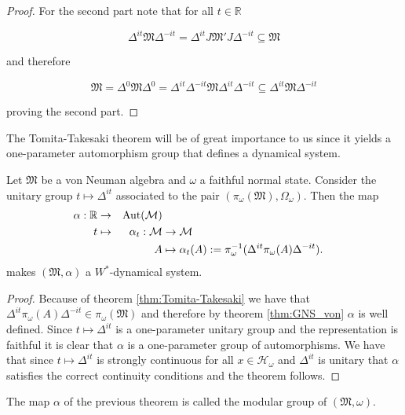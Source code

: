 \begin{proof}
For the second part note that for all $t\in\mathbb{R}$

\begin{equation}
\Delta^{it}\mathfrak{M}\Delta^{-it}=\Delta^{it}J\mathfrak{M}'J\Delta^{-it}\subseteq\mathfrak{M}
\end{equation}

and therefore

\begin{equation}
\mathfrak{M}=\Delta^0\mathfrak{M}\Delta^0=\Delta^{it}\Delta^{-it}\mathfrak{M}\Delta^{it}\Delta^{-it}\subseteq \Delta^{it}\mathfrak{M}\Delta^{-it}
\end{equation}

proving the second part.

\end{proof}

The Tomita-Takesaki theorem will be of great importance to us since it yields a one-parameter automorphism group that defines a dynamical system.

\begin{theorem}\label{thm:Dynamics_Tomita}
Let $\mathfrak{M}$ be a von Neuman algebra and $\omega$ a faithful normal state. Consider the unitary group $t\mapsto\Delta^{it}$ associated to the pair $(\pi_\omega(\mathfrak{M}),\Omega_\omega)$. Then the map
\begin{alignat}{2}
\alpha:\mathbb{R}&\rightarrow & \operatorname{Aut}(\mathcal{M}) \nonumber \\
t&\mapsto &\alpha_t:\mathcal{M} & \rightarrow\mathcal{M} \\
&&A&\mapsto \alpha_t(A):=\pi_\omega^{-1}(\Delta^{it}\pi_\omega(A)\Delta^{-it}). \nonumber
\end{alignat}
makes $(\mathfrak{M},\alpha)$ a $W^*$-dynamical system.
\end{theorem}

\begin{proof}
Because of theorem \ref{thm:Tomita-Takesaki} we have that $\Delta^{it}\pi_\omega(A)\Delta^{-it}\in\pi_\omega(\mathfrak{M})$ and therefore by theorem \ref{thm:GNS_von} $\alpha$ is well defined. Since $t\mapsto\Delta^{it}$ is a one-parameter unitary group and the representation is faithful it is clear that $\alpha$ is a one-parameter group of automorphisms. We have that since $t\mapsto\Delta^{it}$ is strongly continuous for all $x\in\mathcal{H}_\omega$ and $\Delta^{it}$ is unitary that $\alpha$ satisfies the correct continuity conditions and the theorem follows.
\end{proof}

\begin{definition}
The map $\alpha$ of the previous theorem is called the modular group of $(\mathfrak{M},\omega)$.
\end{definition}